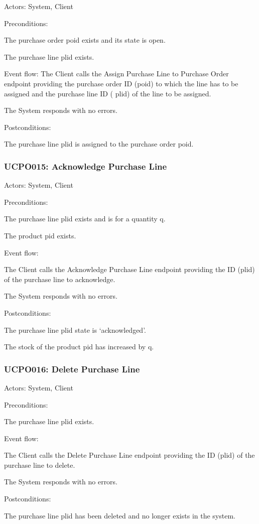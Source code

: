 Actors: System, Client

Preconditions:

\ucitem The purchase order poid exists and its state is open.

\ucitem The purchase line plid exists.

Event flow:
\ucitem The Client calls the Assign Purchase Line to Purchase Order endpoint providing the purchase order ID (poid) to which the line has to be assigned and the purchase line ID (
plid) of the line to be assigned.

\ucitem The System responds with no errors.

Postconditions:

\ucitem The purchase line plid is assigned to the purchase order poid.

\subsubsection{UCPO015: Acknowledge Purchase Line}
\label{UCPO015}

Actors: System, Client

Preconditions:

\ucitem The purchase line plid exists and is for a quantity q.

\ucitem The product pid exists. 

Event flow:

\ucitem The Client calls the Acknowledge Purchase Line endpoint providing the ID (plid) of the purchase line to acknowledge.

\ucitem The System responds with no errors.

Postconditions:

\ucitem The purchase line plid state is ‘acknowledged’.

\ucitem The stock of the product pid has increased by q.

\subsubsection{UCPO016: Delete Purchase Line}
\label{UCPO016}

Actors: System, Client

Preconditions:

\ucitem The purchase line plid exists.

Event flow:

\ucitem The Client calls the Delete Purchase Line endpoint providing the ID (plid) of the purchase line to delete.

\ucitem The System responds with no errors.

Postconditions:

\ucitem The purchase line plid has been deleted and no longer exists in the system.